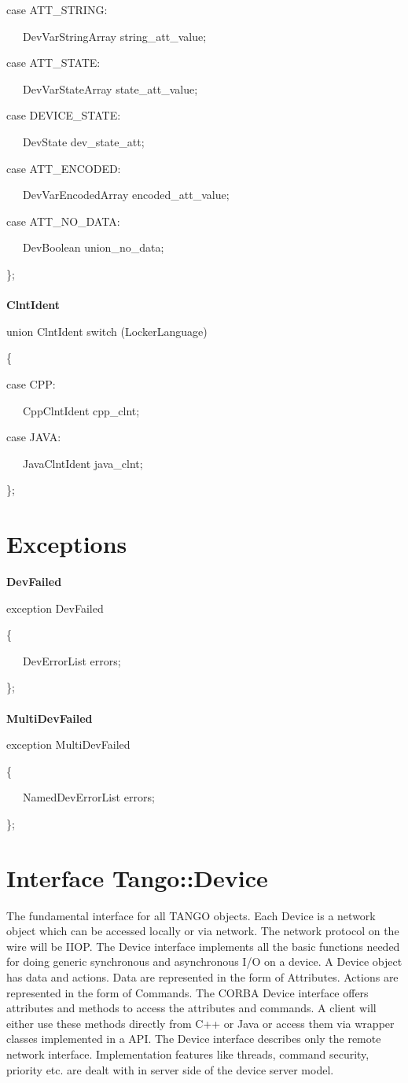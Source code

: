 case ATT\_STRING:

~~~DevVarStringArray string\_att\_value;

case ATT\_STATE:

~~~DevVarStateArray state\_att\_value;

case DEVICE\_STATE:

~~~DevState dev\_state\_att;

case ATT\_ENCODED:

~~~DevVarEncodedArray encoded\_att\_value;

case ATT\_NO\_DATA:

~~~DevBoolean union\_no\_data;

\};\textbf{}\\
\textbf{}\\
\textbf{ClntIdent}

union ClntIdent switch (LockerLanguage)

\{

case CPP:

~~~CppClntIdent cpp\_clnt;

case JAVA:

~~~JavaClntIdent java\_clnt;

\};

\section{Exceptions}

\textbf{DevFailed}

exception DevFailed

\{

~~~DevErrorList errors;

\};\textbf{}\\
\textbf{}\\
\textbf{MultiDevFailed}

exception MultiDevFailed

\{

~~~NamedDevErrorList errors;

\};\\


\section{Interface Tango::Device}

The fundamental interface for all TANGO objects. Each Device is a
network object which can be accessed locally or via network. The network
protocol on the wire will be IIOP. The Device interface implements
all the basic functions needed for doing generic synchronous and asynchronous
I/O on a device. A Device object has data and actions. Data are represented
in the form of Attributes. Actions are represented in the form of
Commands. The CORBA Device interface offers attributes and methods
to access the attributes and commands. A client will either use these
methods directly from C++ or Java or access them via wrapper classes
implemented in a API. The Device interface describes only the remote
network interface. Implementation features like threads, command security,
priority etc. are dealt with in server side of the device server model.

